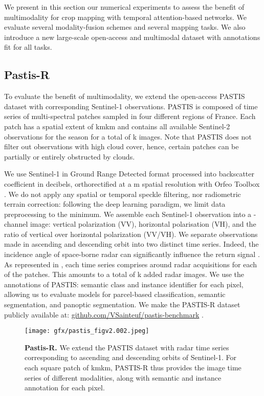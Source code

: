We present in this section our numerical experiments to assess the benefit of multimodality for crop mapping with temporal attention-based networks. We evaluate several modality-fusion schemes and several mapping tasks. We also introduce a new large-scale open-access  and multimodal  dataset with annotations fit for all tasks.
\subsection{Pastis-R}
To evaluate the benefit of multimodality, we extend the open-access PASTIS dataset \citep{pastis} with corresponding Sentinel-1 observations.
PASTIS is composed of  time series of  multi-spectral patches sampled in four different regions of France. Each patch has a spatial extent of kmkm and contains all available Sentinel-2 observations for the  season for a total of k images.
Note that PASTIS does not filter out  observations with high cloud cover, hence, certain patches can be partially or entirely obstructed by clouds.


We use Sentinel-1 in Ground Range Detected format processed into {  backscatter coefficient } in decibels, {orthorectified at a } m spatial resolution with Orfeo Toolbox \citep{christophe2008orfeo}. We do not apply any spatial or temporal speckle filtering, {nor radiometric terrain correction}: {following the deep learning paradigm, we limit data preprocessing to the minimum.} We assemble each Sentinel-1 observation into a -channel image: vertical polarization (VV), horizontal polarisation (VH), and the ratio of vertical over horizontal polarization (VV/VH). We separate observations made in ascending and descending orbit into two distinct time series. Indeed, the incidence angle of space-borne radar can significantly influence the return signal \citep{singhroy1999effects}. As represented in , each time series comprises around  radar acquisitions { for each of the  patches. This amounts to } a total of k added radar images.
We use the annotations of PASTIS: semantic class and instance identifier for each pixel, allowing us to evaluate models for parcel-based classification, semantic segmentation, and panoptic segmentation. We make the PASTIS-R dataset \citep{pastis-r} publicly available at: \url{github.com/VSainteuf/pastis-benchmark} . 

\begin{figure}
    \centering
    \texttt{[image: gfx/pastis\_figv2.002.jpeg]}
    \caption{\textbf{{Pastis-R.}} We extend the PASTIS dataset with radar time series corresponding to ascending and descending orbits of Sentinel-1. For each square patch of kmkm, PASTIS-R thus provides the image time series of  different modalities, along with semantic and instance annotation for each pixel.}
    \label{fig:pastis}
\end{figure}

